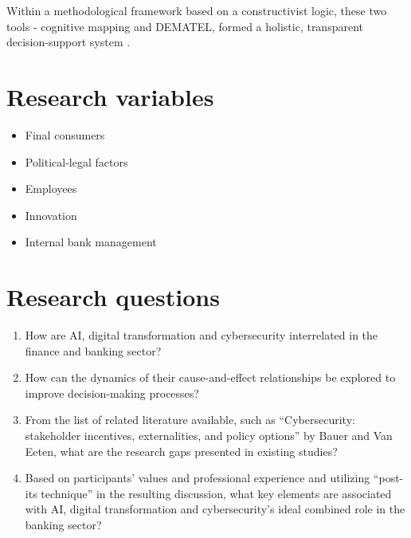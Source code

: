 \documentclass{article}
\begin{document}
Within a methodological framework based on a constructivist logic, these two tools - cognitive mapping and DEMATEL, formed a holistic, transparent decision-support system \cite{rodrigues2022artificial}.

\section*{Research variables}
\begin{itemize}
  \item Final consumers
  \item Political-legal factors
  \item Employees
  \item Innovation
  \item Internal bank management
\end{itemize}
\section*{Research questions}
\begin{enumerate}
  \item How are AI, digital transformation and cybersecurity interrelated in the finance and banking sector?
  \item How can the dynamics of their cause-and-effect relationships be explored to improve decision-making processes? \cite{rodrigues2022artificial}
  \item From the list of related literature available, such as “Cybersecurity: stakeholder incentives, externalities, and policy options” by Bauer and Van Eeten, what are the research gaps presented in existing studies? \cite{bauer2009cybersecurity}
  \item Based on participants’ values and professional experience and utilizing “post-its technique'' \cite{eden2004cognitive} in the resulting discussion, what key elements are associated with AI, digital transformation and cybersecurity’s ideal combined role in the banking sector? \cite{rodrigues2022artificial}
\end{enumerate}




\end{document}
